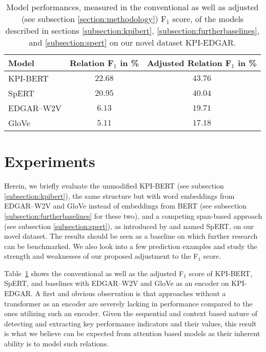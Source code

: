 \documentclass[conference, table]{IEEEtran}
\newcommand{\1} {\mathbbm{1}}
\begin{document}
\addtocounter{footnote}{-1}
\begin{table}[t]
\centering
\scriptsize
{}
\begin{tabular}{lcc}
\toprule
\rowcolor{white} Model & Relation F$_1$ in \% & Adjusted Relation F$_1$ in \%\\
\midrule
KPI-BERT   & $\bm{22.68}$ & $\bm{43.76}$ \\

SpERT   & $20.95$ & $40.04$\\
EDGAR--W2V   & $6.13$ & $19.71$\\
GloVe   & $5.11$ & $17.18$\\



\bottomrule
\end{tabular} \caption{
Model performances\protect\footnotemark, measured in the conventional as well as adjusted (see subsection \ref{section:methodology}) F$_1$ score, of the models described in sections \ref{subsection:kpibert}, \ref{subsection:furtherbaselines}, and \ref{subsection:spert} on our novel dataset KPI-EDGAR.
}
\label{tab:models}
\end{table}

\section{Experiments}
\label{section:experiments}

Herein, we briefly evaluate the unmodified KPI-BERT \cite{kpi-bert} (see subsection \ref{subsection:kpibert}), the same structure but with word embeddings from EDGAR--W2V \cite{loukas2021edgar} and GloVe \cite{pennington2014glove} 
instead of embeddings from BERT \cite{devlin2018bert} (see subsection \ref{subsection:furtherbaselines} for these two), and a competing span-based approach (see subsection \ref{subsection:spert}), as introduced by \cite{eberts2019span} and named SpERT, on our novel dataset. The results should be seen as a baseline on which further research can be benchmarked. We also look into a few prediction examples and study the strength and weaknesses of our proposed adjustment to the F$_1$ score.


Table~\ref{tab:models} shows the conventional as well as the adjusted F$_1$ score of KPI-BERT, SpERT, and baselines with EDGAR--W2V and GloVe as an encoder on KPI-EDGAR. A first and obvious observation is that approaches without a transformer as an encoder are severely lacking in performance compared to the ones utilizing such an encoder. Given the sequential and context based nature of detecting and extracting key performance indicators and their values, this result is what we believe can be expected from attention based models as their inherent ability is to model such relations. 
\end{document}
